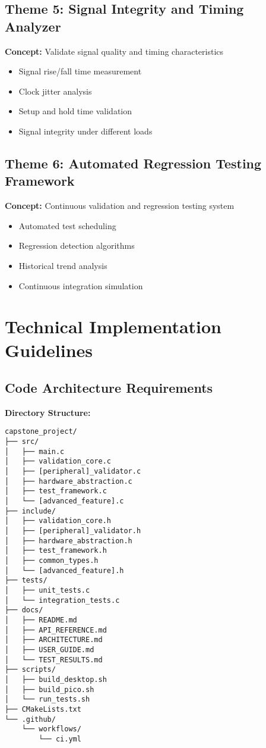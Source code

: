 \documentclass[11pt,a4paper]{article}
\begin{document}
\subsection{Theme 5: Signal Integrity and Timing Analyzer}
\textbf{Concept:} Validate signal quality and timing characteristics
\begin{itemize}
    \item Signal rise/fall time measurement
    \item Clock jitter analysis
    \item Setup and hold time validation
    \item Signal integrity under different loads
\end{itemize}

\subsection{Theme 6: Automated Regression Testing Framework}
\textbf{Concept:} Continuous validation and regression testing system
\begin{itemize}
    \item Automated test scheduling
    \item Regression detection algorithms
    \item Historical trend analysis
    \item Continuous integration simulation
\end{itemize}

\section{Technical Implementation Guidelines}

\subsection{Code Architecture Requirements}

\textbf{Directory Structure:}
\begin{verbatim}
capstone_project/
├── src/
│   ├── main.c
│   ├── validation_core.c
│   ├── [peripheral]_validator.c
│   ├── hardware_abstraction.c
│   ├── test_framework.c
│   └── [advanced_feature].c
├── include/
│   ├── validation_core.h
│   ├── [peripheral]_validator.h
│   ├── hardware_abstraction.h
│   ├── test_framework.h
│   ├── common_types.h
│   └── [advanced_feature].h
├── tests/
│   ├── unit_tests.c
│   └── integration_tests.c
├── docs/
│   ├── README.md
│   ├── API_REFERENCE.md
│   ├── ARCHITECTURE.md
│   ├── USER_GUIDE.md
│   └── TEST_RESULTS.md
├── scripts/
│   ├── build_desktop.sh
│   ├── build_pico.sh
│   └── run_tests.sh
├── CMakeLists.txt
└── .github/
    └── workflows/
        └── ci.yml
\end{verbatim}
\end{document}
